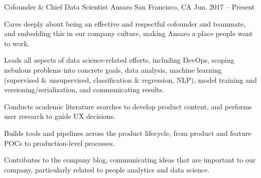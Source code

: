 
\begin{cventries}

  \cventry
    {Cofounder \& Chief Data Scientist} %
    {Ansaro} %
    {San Francisco, CA} %
    {Jun. 2017 -- Present} %
    {
      \begin{cvitems} %
        \item {Cares deeply about being an effective and respectful cofounder and teammate, and embedding this in our company culture, making Ansaro a place people want to work.}
        \item {Leads all aspects of data science-related efforts, including DevOps, scoping nebulous problems into concrete goals, data analysis, machine learning (supervised \& unsupervised, classification \& regression, NLP), model training and versioning/serialization, and communicating results.}
        \item {Conducts academic literature searches to develop product content, and performs user research to guide UX decisions.}
        \item {Builds tools and pipelines across the product lifecycle, from product and feature POCs to production-level processes.}
        \item {Contributes to the company blog, communicating ideas that are important to our company, particularly related to people analytics and data science.}
     \end{cvitems}
    }


\end{cventries}
